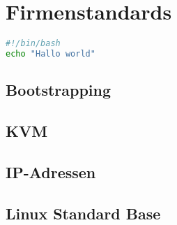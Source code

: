 \chapter{Firmenstandards}
\begin{lstlisting}[language=bash, caption=blabla]
#!/bin/bash
echo "Hallo world"
\end{lstlisting}
\section{Bootstrapping}
\section{KVM}
\section{IP-Adressen}
\section{Linux Standard Base}